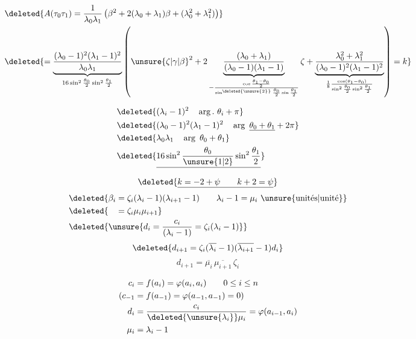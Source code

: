 
\[
\begin{aligned}
&\deleted{A(\tau_0\tau_1)=\frac1{\lambda_0\lambda_1}
\left(\beta^2+2(\lambda_0+\lambda_1)\beta+(\lambda_0^2+\lambda_1^2)\right)}\\
&\deleted{=\underbrace{\frac{(\lambda_0-1)^2(\lambda_1-1)^2}{\lambda_0\lambda_1}}_{16\sin^2\frac{\theta_0}{2}\sin^2\frac{\theta_1}{2}}
\left({\unsure{\zeta|\gamma|\beta}}^2+2\underbrace{\frac{(\lambda_0+\lambda_1)}{(\lambda_0-1)(\lambda_1-1)}}_{-\frac{\cos\frac{\theta_1-\theta_0}{2}}{\sin^{\deleted{\unsure{2}}}\frac{\theta_0}{2}\sin\frac{\theta_1}{2}}}\zeta
+\underbrace{\frac{\lambda_0^2+\lambda_1^2}{(\lambda_0-1)^2(\lambda_1-1)^2}}_{\frac18\frac{\cos(\theta_1-\theta_0)}{\sin^2\frac{\theta_0}{2}\sin^2\frac{\theta_1}{2}}}\right)=k}
\end{aligned}
\]

\[
\begin{aligned}
&\deleted{(\lambda_i-1)^2\quad\arg.\ \theta_i+\pi}\\
&\deleted{(\lambda_0-1)^2(\lambda_1-1)^2\quad\arg\ \underline{\theta_0+\theta_1}+2\pi}\\
&\deleted{\lambda_0\lambda_1\quad\arg\ \theta_0+\theta_1}\\
&\deleted{\underline{16\sin^2\frac{\theta_0}{\unsure{1|2}}\sin^2\frac{\theta_1}{2}}}
\end{aligned}
\]

\[
\deleted{\underline{k=-2+\psi\qquad k+2=\psi}}
\]
\[
\begin{aligned}
&\deleted{\beta_i=\zeta_i(\lambda_i-1)(\lambda_{i+1}-1)\qquad \lambda_i-1=\mu_i\ \text{\unsure{unités|unité}}}\\
&\deleted{\phantom{\beta_i}=\zeta_i\mu_i\mu_{i+1}}\\
&\deleted{\unsure{d_i=\frac{c_i}{(\lambda_i-1)}=\zeta_i(\lambda_i-1)}}
\end{aligned}
\]
\[
\deleted{d_{i+1}=\zeta_i(\overline{\lambda_i}-1)(\overline{\lambda_{i+1}}-1)d_i}
\]
\[
d_{i+1}=\overline{\mu_i}\,\overline{\mu_{i+1}}\,\zeta_i
\]

\[
\begin{aligned}
c_i&=f(a_i)=\varphi(a_i,a_i)\qquad 0\leq i\leq n\\
(c_{-1}&=f(a_{-1})=\varphi(a_{-1},a_{-1})=0)\\
d_i&=\frac{c_i}{\deleted{\unsure{\lambda_i}}\mu_i}=\varphi(a_{i-1},a_i)\\
\mu_i&=\lambda_i-1
\end{aligned}
\]

